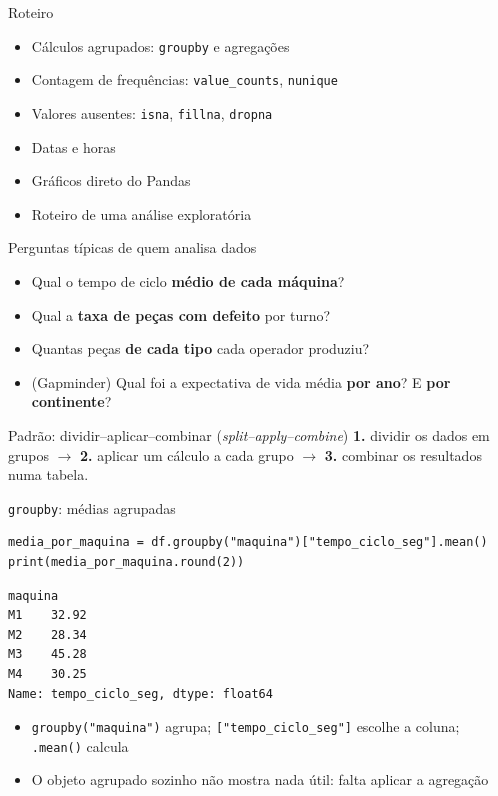 \documentclass[aspectratio=169,10pt,t]{beamer}
\begin{document}
\capa

\begin{frame}{Roteiro}
  \begin{itemize}
    \item Cálculos agrupados: \texttt{groupby} e agregações
    \item Contagem de frequências: \texttt{value\_counts}, \texttt{nunique}
    \item Valores ausentes: \texttt{isna}, \texttt{fillna}, \texttt{dropna}
    \item Datas e horas
    \item Gráficos direto do Pandas
    \item Roteiro de uma análise exploratória
  \end{itemize}
\end{frame}

\begin{frame}{Perguntas típicas de quem analisa dados}
  \begin{itemize}
    \item Qual o tempo de ciclo \textbf{médio de cada máquina}?
    \item Qual a \textbf{taxa de peças com defeito} por turno?
    \item Quantas peças \textbf{de cada tipo} cada operador produziu?
    \item (Gapminder) Qual foi a expectativa de vida média \textbf{por ano}? E \textbf{por continente}?
  \end{itemize}
  \begin{block}{Padrão: dividir--aplicar--combinar (\emph{split--apply--combine})}
    \textbf{1.} dividir os dados em grupos \(\to\) \textbf{2.} aplicar um cálculo a cada grupo \(\to\) \textbf{3.} combinar os resultados numa tabela.
  \end{block}
\end{frame}

\begin{frame}[fragile]{\texttt{groupby}: médias agrupadas}
\begin{lstlisting}
media_por_maquina = df.groupby("maquina")["tempo_ciclo_seg"].mean()
print(media_por_maquina.round(2))
\end{lstlisting}
\begin{lstlisting}[style=saida]
maquina
M1    32.92
M2    28.34
M3    45.28
M4    30.25
Name: tempo_ciclo_seg, dtype: float64
\end{lstlisting}
  \begin{itemize}\small
    \item \texttt{groupby("maquina")} agrupa; \texttt{["tempo\_ciclo\_seg"]} escolhe a coluna; \texttt{.mean()} calcula
    \item O objeto agrupado sozinho não mostra nada útil: falta aplicar a agregação
  \end{itemize}
\end{frame}
\end{document}
